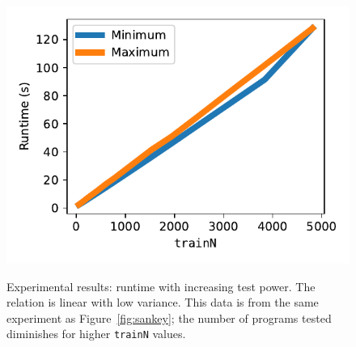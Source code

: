 \documentclass[acmlarge, manuscript, screen, review, anonymous, table]{acmart}
\begin{document}
\begin{figure}[tbhp]
  \newcommand{\gsize}{.38\textwidth}
  \includegraphics[width=\gsize]{graphs/asymptote_time.pdf} \\
  \caption{Experimental results: runtime with increasing test power. The relation is linear with low variance.
           This data is from the same experiment as Figure~\ref{fig:sankey};
           the number of programs tested diminishes for higher \texttt{trainN} values.
           }
  \label{fig:linear-time}
\end{figure}
\end{document}
